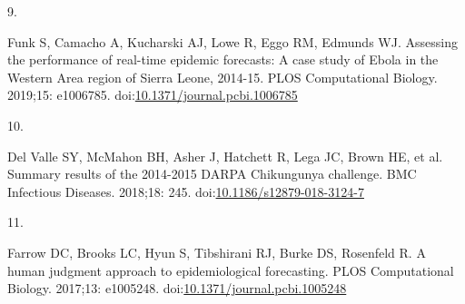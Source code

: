 \documentclass[10pt,letterpaper]{article} %
\newlength{\cslhangindent}
\newlength{\csllabelwidth}
\newlength{\cslentryspacingunit} %
\newenvironment{CSLReferences}[2] %
 {%
  \setlength{\parindent}{0pt}
  \ifodd #1
  \let\oldpar\par
  \def\par{\hangindent=\cslhangindent\oldpar}
  \fi
  \setlength{\parskip}{#2\cslentryspacingunit}
 }%
 {}
\newcommand{\CSLLeftMargin}[1]{\parbox[t]{\csllabelwidth}{#1}}
\newcommand{\CSLRightInline}[1]{\parbox[t]{\linewidth - \csllabelwidth}{#1}\break}
\providecommand{\DIFaddbegin}{} %
\providecommand{\DIFaddend}{} %
\providecommand{\DIFdelbegin}{} %
\providecommand{\DIFdelend}{} %
\newcommand{\DIFscaledelfig}{0.5}
\newlength{\DIFdelgraphicswidth} %
\newlength{\DIFdelgraphicsheight} %
\newcommand{\DIFaddincludegraphics}[2][]{{\color{blue}\fbox{\DIFOincludegraphics[#1]{#2}}}} %
\newcommand{\DIFdelincludegraphics}[2][]{%
\sbox{\DIFdelgraphicsbox}{\DIFOincludegraphics[#1]{#2}}%
\settoboxwidth{\DIFdelgraphicswidth}{\DIFdelgraphicsbox} %
\settoboxtotalheight{\DIFdelgraphicsheight}{\DIFdelgraphicsbox} %
\scalebox{\DIFscaledelfig}{%
\parbox[b]{\DIFdelgraphicswidth}{\usebox{\DIFdelgraphicsbox}\\[-\baselineskip] \rule{\DIFdelgraphicswidth}{0em}}\llap{\resizebox{\DIFdelgraphicswidth}{\DIFdelgraphicsheight}{%
\setlength{\unitlength}{\DIFdelgraphicswidth}%
\begin{picture}(1,1)%
\thicklines\linethickness{2pt} %
{\color[rgb]{1,0,0}\put(0,0){\framebox(1,1){}}}%
{\color[rgb]{1,0,0}\put(0,0){\line( 1,1){1}}}%
{\color[rgb]{1,0,0}\put(0,1){\line(1,-1){1}}}%
\end{picture}%
}\hspace*{3pt}}} %
} %
\DeclareRobustCommand{\DIFaddbegin}{\DIFOaddbegin \let\includegraphics\DIFaddincludegraphics} %
\DeclareRobustCommand{\DIFaddend}{\DIFOaddend \let\includegraphics\DIFOincludegraphics} %
\DeclareRobustCommand{\DIFdelbegin}{\DIFOdelbegin \let\includegraphics\DIFdelincludegraphics} %
\DeclareRobustCommand{\DIFdelend}{\DIFOaddend \let\includegraphics\DIFOincludegraphics} %
\begin{document}
\begin{CSLReferences}{0}{0}
\leavevmode{}%
\CSLLeftMargin{9. }
\DIFdelbegin %
\DIFdelend \DIFaddbegin \CSLRightInline{Funk S, Camacho A, Kucharski AJ, Lowe R, Eggo RM,
Edmunds WJ. Assessing the performance of real-time epidemic forecasts:
{A} case study of {Ebola} in the {Western Area} region of {Sierra
Leone}, 2014-15. PLOS Computational Biology. 2019;15: e1006785.
doi:\href{https://doi.org/10.1371/journal.pcbi.1006785}{10.1371/journal.pcbi.1006785}}
\DIFaddend 

\leavevmode{}%
\CSLLeftMargin{10. }
\DIFdelbegin %
\DIFdelend \DIFaddbegin \CSLRightInline{Del Valle SY, McMahon BH, Asher J, Hatchett R, Lega JC,
Brown HE, et al. Summary results of the 2014-2015 {DARPA Chikungunya}
challenge. BMC Infectious Diseases. 2018;18: 245.
doi:\href{https://doi.org/10.1186/s12879-018-3124-7}{10.1186/s12879-018-3124-7}}
\DIFaddend 

\leavevmode{}%
\CSLLeftMargin{11. }
\DIFdelbegin %
\DIFdelend \DIFaddbegin \CSLRightInline{Farrow DC, Brooks LC, Hyun S, Tibshirani RJ, Burke DS,
Rosenfeld R. A human judgment approach to epidemiological forecasting.
PLOS Computational Biology. 2017;13: e1005248.
doi:\href{https://doi.org/10.1371/journal.pcbi.1005248}{10.1371/journal.pcbi.1005248}}
\DIFaddend 


\end{CSLReferences}
\end{document}

